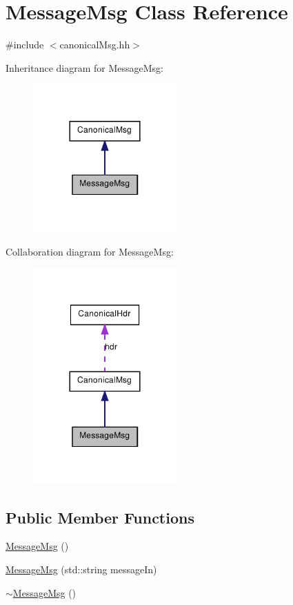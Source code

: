 \hypertarget{class_message_msg}{
\section{MessageMsg Class Reference}
\label{class_message_msg}
}


{\ttfamily \#include $<$canonicalMsg.hh$>$}



Inheritance diagram for MessageMsg:\nopagebreak
\begin{figure}[H]
\begin{center}
\leavevmode
\includegraphics[width=156pt]{class_message_msg__inherit__graph}
\end{center}
\end{figure}


Collaboration diagram for MessageMsg:\nopagebreak
\begin{figure}[H]
\begin{center}
\leavevmode
\includegraphics[width=156pt]{class_message_msg__coll__graph}
\end{center}
\end{figure}
\subsection*{Public Member Functions}
\begin{DoxyCompactItemize}
\item 
\hyperlink{class_message_msg_a24edfba00bfab1e7bd21fbf2b9956b18}{MessageMsg} ()
\item 
\hyperlink{class_message_msg_aed580ec829852dce85503126ba911970}{MessageMsg} (std::string messageIn)
\item 
\hyperlink{class_message_msg_ab06bda21c063027ccde8efdc785ee1b0}{$\sim$MessageMsg} ()
\end{DoxyCompactItemize}
